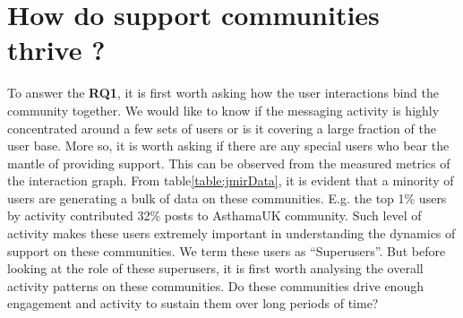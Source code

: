 \section{How do support communities thrive ?}
To answer the \textbf{RQ1}, it is first worth asking how the user interactions bind the community together. We would like to know if the messaging activity is highly concentrated around a few sets of users or is it covering a large fraction of the user base. More so, it is worth asking if there are any special users who bear the mantle of providing support. This can be observed from the measured metrics of the interaction graph. 
From table\ref{table:jmirData}, it is evident that a minority of users are generating a bulk of data on these communities. E.g. the top 1\% users by activity contributed 32\% posts to AsthamaUK community. Such level of activity makes these users extremely important in understanding the dynamics of support on these communities. We term these users as ``Superusers''.
But before looking at the role of these superusers, it is first worth analysing the overall activity patterns on these communities. Do these communities drive enough engagement and activity to sustain them over long periods of time?  

